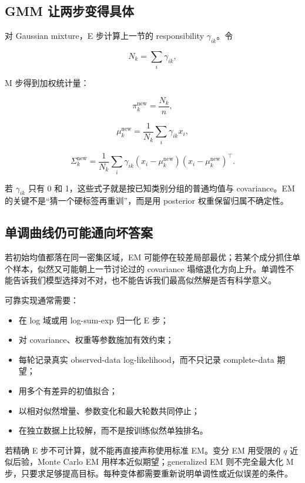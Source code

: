 \subsection{GMM 让两步变得具体}

对 Gaussian mixture，E 步计算上一节的 responsibility \(\gamma_{ik}\)。令

\[
N_k=\sum_i\gamma_{ik},
\]

M 步得到加权统计量：

\[
\pi_k^{\text{new}}=\frac{N_k}{n},
\]

\[
\mu_k^{\text{new}}
=\frac1{N_k}\sum_i\gamma_{ik}x_i,
\]

\[
\Sigma_k^{\text{new}}
=\frac1{N_k}
\sum_i\gamma_{ik}
(x_i-\mu_k^{\text{new}})
(x_i-\mu_k^{\text{new}})^\top.
\]

若 \(\gamma_{ik}\) 只有 0 和 1，这些式子就是按已知类别分组的普通均值与 covariance。EM 的关键不是``猜一个硬标签再重训''，而是用 posterior 权重保留归属不确定性。

\subsection{单调曲线仍可能通向坏答案}

若初始均值都落在同一密集区域，EM 可能停在较差局部最优；若某个成分抓住单个样本，似然又可能朝上一节讨论过的 covariance 塌缩退化方向上升。单调性不能告诉我们模型选择对不对，也不能告诉我们最高似然解是否有科学意义。

可靠实现通常需要：

\begin{itemize}
\tightlist
\item
  在 log 域或用 log-sum-exp 归一化 E 步；
\item
  对 covariance、权重等参数施加有效约束；
\item
  每轮记录真实 observed-data log-likelihood，而不只记录 complete-data 期望；
\item
  用多个有差异的初值拟合；
\item
  以相对似然增量、参数变化和最大轮数共同停止；
\item
  在独立数据上比较解，而不是按训练似然单独排名。
\end{itemize}

若精确 E 步不可计算，就不能再直接声称使用标准 EM。变分 EM 用受限的 \(q\) 近似后验，Monte Carlo EM 用样本近似期望；generalized EM 则不完全最大化 M 步，只要求足够提高目标。每种变体都需要重新说明单调性或近似误差的条件。
